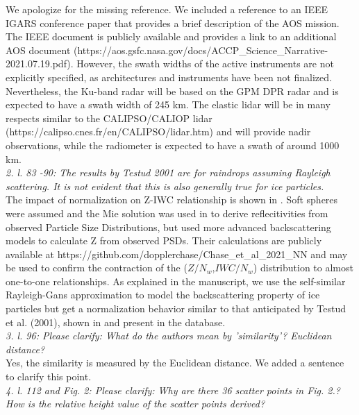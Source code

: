 \documentclass[12pt]{article}
\begin{document}
\newline
We apologize for the missing reference.  We included a reference to an IEEE IGARS conference paper \cite{braun2022} that provides a brief description of the AOS mission.
The IEEE document is publicly available and provides a link to an additional AOS document (https://aos.gsfc.nasa.gov/docs/ACCP\_Science\_Narrative-2021.07.19.pdf). 
However, the swath widths of the active instruments are not explicitly specified, as architectures and instruments have been not finalized.  Nevertheless,
the Ku-band radar will be based on the GPM DPR radar and is expected to have a swath width of 245 km.  The elastic lidar will be in many respects 
similar to the CALIPSO/CALIOP lidar (https://calipso.cnes.fr/en/CALIPSO/lidar.htm) and will provide nadir observations,  while the radiometer is expected 
to have a swath of around 1000 km.\\
\newline
\textit{2. l. 83 -90: The results by Testud 2001 are for raindrops assuming Rayleigh scattering. It is not evident that this 
    is also generally true for ice particles.}\\
\newline
The impact of normalization on Z-IWC relationship is shown in \cite{delanoe2014}. Soft spheres were assumed and the Mie solution was used in \cite{delanoe2014}
to derive reflecitivities from observed Particle Size Distributions, but \cite{chase2021}  used more advanced backscattering models to calculate Z from
observed PSDs.  Their calculations are publicly available at https://github.com/dopplerchase/Chase\_et\_al\_2021\_NN and may be used to confirm the contraction
of the ($Z/N_w$,$IWC/N_w$) distribution to almost one-to-one relationships.  As explained in the manuscript, we use the self-similar Rayleigh-Gans approximation
to model the backscattering property of ice particles but get a normalization behavior similar to that anticipated by Testud et al. (2001),
shown in \cite{delanoe2014} and present in the \cite{chase2021} database.\\
\newline
\textit{3. l. 96: Please clarify: What do the authors mean by 'similarity'? Euclidean distance?}\\
\newline
Yes, the similarity is measured by the Euclidean distance.  We added a sentence to clarify this point.\\
\newline    
\textit{4. l. 112 and Fig. 2: Please clarify: Why are there 36 scatter points in Fig. 2.? How is the relative height value 
    of the scatter points derived?}\\
\end{document}
